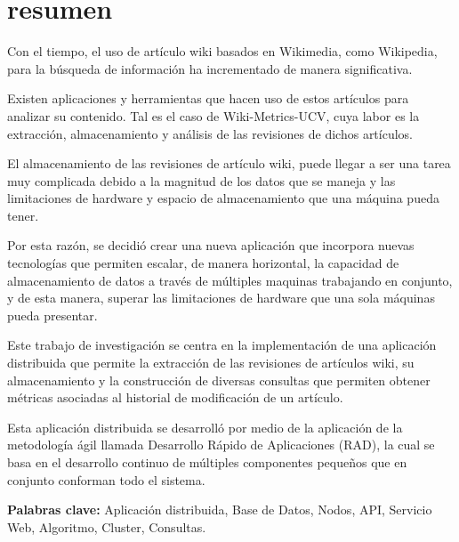 \section*{resumen}

Con el tiempo, el uso de artículo wiki basados en Wikimedia,
como Wikipedia, para la búsqueda de información ha incrementado de
manera significativa.

Existen aplicaciones y herramientas que hacen uso de estos artículos
para analizar su contenido.
Tal es el caso de Wiki-Metrics-UCV, cuya labor es la extracción,
almacenamiento y análisis de las revisiones de dichos artículos.

El almacenamiento de las revisiones de artículo wiki,
puede llegar a ser una tarea muy complicada debido a la magnitud de los datos que se maneja y las limitaciones de hardware y espacio de almacenamiento que una máquina pueda tener.

Por esta razón, se decidió crear una nueva aplicación que incorpora
nuevas tecnologías que permiten escalar, de manera horizontal, la capacidad
de almacenamiento de datos a través de múltiples maquinas trabajando en conjunto, y de esta manera,
superar las limitaciones de hardware que una sola máquinas pueda presentar.

Este trabajo de investigación se centra en la implementación de una aplicación distribuida
que permite la extracción de las revisiones de artículos wiki, su almacenamiento y la
construcción de diversas consultas que permiten obtener métricas asociadas al historial
de modificación de un artículo.

Esta aplicación distribuida se desarrolló por medio de la aplicación de la metodología
ágil llamada Desarrollo Rápido de Aplicaciones (RAD), la cual se basa en el desarrollo
continuo de múltiples componentes pequeños que en conjunto conforman todo el sistema.

\textbf{Palabras clave:} Aplicación distribuida, Base de Datos, Nodos, API, Servicio Web, Algoritmo, Cluster, Consultas.
